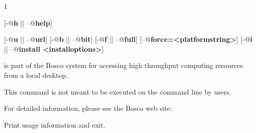 \begin{ManPage}{\label{man-bosco-findplatform}}{1}
{}


\Synopsis {}
[\verb@-@\textbf{h} || \verb@--@\textbf{help}]

[\verb@-@\textbf{u} || \verb@--@\textbf{url}]
[\verb@-@\textbf{b} || \verb@--@\textbf{bit}]
[\verb@-@\textbf{f} || \verb@--@\textbf{full}]
[\verb@--@\textbf{force=<platformstring>}]
[\verb@-@\textbf{i} || \verb@--@\textbf{install <installoptions>}]

\Description

 is part of the Bosco system for accessing high
throughput computing resources from a local desktop.

This command is not meant to be executed on the command line by users.

For detailed information, please see the Bosco web site:

\begin{Options}
   {Print usage information and exit.}

\end{Options}


\end{ManPage}
